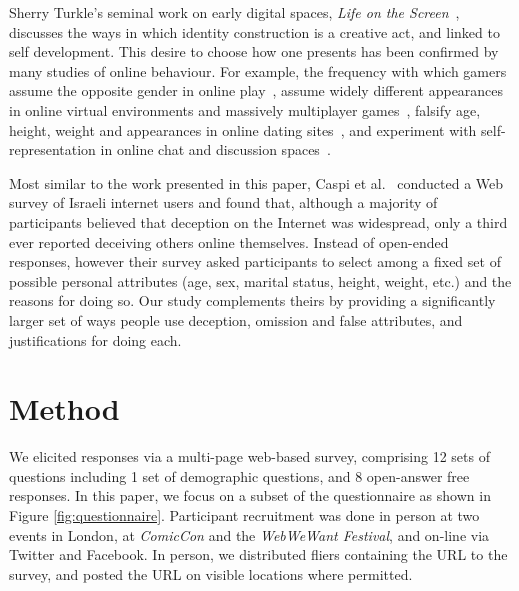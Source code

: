 \documentclass{sig-alternate}
\newcommand{\todo}[1]{\textbf{\color{red}TODO: #1}}
\begin{document}
Sherry Turkle's seminal work on early digital spaces, \emph{Life on the Screen}~\cite{turkle2011life}, discusses the ways in which identity construction is a creative act, and linked to self development.
This desire to choose how one presents has been confirmed by many studies of online behaviour.
For example, the frequency with which gamers assume the opposite gender in online play~\cite{hussain2008gender,potts2014love,van2008theorizing}, assume widely different appearances in online virtual environments and massively multiplayer games~\cite{yee2009proteus}, falsify age, height, weight and appearances in online dating sites~\cite{Hancock:2007:TLO:1240624.1240697,JCC4:JCC420}, and experiment with self-representation in online chat and discussion spaces~\cite{donath1999identity,whitty2002liar,whitty2001age}.

Most similar to the work presented in this paper, Caspi et al.~\cite{caspi2006online} conducted a Web survey of Israeli internet users and found that, although a majority of participants believed that deception on the Internet was widespread, only a third ever reported deceiving others online themselves.  Instead of open-ended responses, however their survey asked participants to select among a fixed set of possible personal attributes (age, sex, marital status, height, weight, etc.) and the reasons for doing so. Our study complements theirs by providing a significantly larger set of ways people use deception, omission and false attributes, and justifications for doing each. %

\section{Method}


We elicited responses via a multi-page web-based survey, comprising 12 sets of questions including 1 set of demographic questions, and 8 open-answer free responses. In this paper, we focus on a subset of the questionnaire as shown in Figure \ref{fig:questionnaire}.  Participant recruitment was done in person at two events in London, at \emph{ComicCon} and the \emph{WebWeWant Festival}, and on-line via Twitter and Facebook.  In person, we distributed fliers containing the URL to the survey, and posted the URL on visible locations where permitted.  
\end{document}
